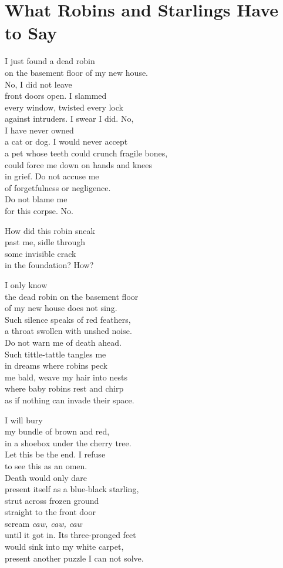 \documentclass[twoside,10pt]{book}
\begin{document}
\clearpage
\section{What Robins and Starlings Have to Say}

I just found a dead robin\\
on the basement floor of my new house.\\
No, I did not leave\\
front doors open. I slammed\\
every window, twisted every lock\\
against intruders. I swear I did. No,\\
I have never owned\\
a cat or dog. I would never accept\\
a pet whose teeth could crunch fragile bones,\\
could force me down on hands and knees\\
in grief. Do not accuse me\\
of forgetfulness or negligence.\\
Do not blame me\\
for this corpse. No.

How did this robin sneak\\
past me, sidle through\\
some invisible crack\\
in the foundation? How?

I only know\\
the dead robin on the basement floor\\
of my new house does not sing.\\
Such silence speaks of red feathers,\\
a throat swollen with unshed noise.\\
Do not warn me of death ahead.\\
Such tittle-tattle tangles me\\
in dreams where robins peck\\
me bald, weave my hair into nests\\
where baby robins rest and chirp\\
as if nothing can invade their space.

I will bury\\
my bundle of brown and red,\\
in a shoebox under the cherry tree.\\
Let this be the end. I refuse\\
to see this as an omen.\\
Death would only dare\\
present itself as a blue-black starling,\\
strut across frozen ground\\
straight to the front door\\
scream \emph{caw, caw, caw}\\
until it got in. Its three-pronged feet\\
would sink into my white carpet,\\
present another puzzle I can not solve.
\end{document}
